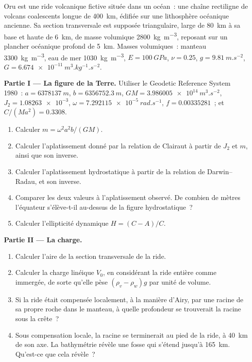 \begin{problem}
\label{pb:b3:gravity-geodesy:1}
Oru est une ride volcanique fictive située dans un océan~: une chaîne rectiligne de volcans coalescents
longue de \qty{400}{km}, édifiée sur une lithosphère océanique ancienne. Sa section transversale est
supposée triangulaire, large de \qty{80}{km} à sa base et haute de
\qty{6}{km}, de masse volumique \qty{2800}{kg.m^{-3}}, reposant sur un plancher océanique
profond de \qty{5}{km}. Masses volumiques~: manteau \qty{3300}{kg.m^{-3}}, eau de
mer \qty{1030}{kg.m^{-3}}, $E = \qty{100}{GPa}$, $\nu = 0.25$, $g =
\qty{9.81}{m.s^{-2}}$, $G = \qty{6.674e-11}{m^3.kg^{-1}.s^{-2}}$.

\medskip
\noindent\textbf{Partie I --- La figure de la Terre.} Utiliser le Geodetic Reference
System 1980~: $a = \qty{6378137}{m}$, $b = \qty{6356752.3}{m}$,
$GM = \qty{3.986005e14}{m^3.s^{-2}}$, $J_2 = \num{1.08263e-3}$,
$\omega = \qty{7.292115e-5}{rad.s^{-1}}$, $f = \num{0.00335281}$~; et
$C/(Ma^2) = \num{0.3308}$.
\begin{enumerate}
  \item Calculer $m = \omega^2a^2b/(GM)$.
  \item Calculer l'aplatissement donné par la relation de Clairaut à partir de $J_2$ et
        $m$, ainsi que son inverse.
  \item Calculer l'aplatissement hydrostatique à partir de la relation de Darwin--Radau, et
        son inverse.
  \item Comparer les deux valeurs à l'aplatissement observé. De combien de mètres
        l'équateur s'élève-t-il au-dessus de la figure hydrostatique~?
  \item Calculer l'ellipticité dynamique $H = (C - A)/C$.
\end{enumerate}

\noindent\textbf{Partie II --- La charge.}
\begin{enumerate}[resume]
  \item Calculer l'aire de la section transversale de la ride.
  \item Calculer la charge linéique $V_0$, en considérant la ride entière comme immergée, de sorte
        qu'elle pèse $(\rho_v - \rho_w)g$ par unité de volume.
  \item Si la ride était compensée localement, à la manière d'Airy, par une racine de
        sa propre roche dans le manteau, à quelle profondeur se trouverait la racine sous
        la crête~?
  \item Sous compensation locale, la racine se terminerait au pied de la ride,
        à \qty{40}{km} de son axe. La bathymétrie révèle une fosse qui s'étend jusqu'à
        \qty{165}{km}. Qu'est-ce que cela révèle~?
\end{enumerate}


\end{problem}

